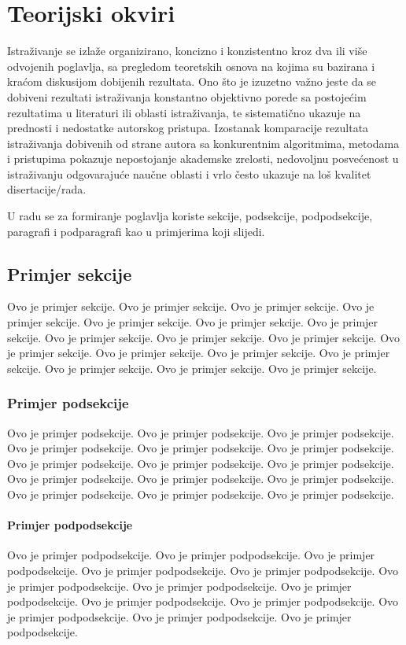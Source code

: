 \chapter{Teorijski okviri}

Istraživanje se izlaže organizirano, koncizno i konzistentno kroz dva ili više odvojenih poglavlja, sa  pregledom teoretskih osnova na kojima su bazirana i kraćom diskusijom dobijenih rezultata. Ono što je izuzetno važno jeste da se dobiveni rezultati istraživanja konstantno objektivno porede sa postojećim rezultatima u literaturi ili oblasti istraživanja, te sistematično ukazuje na prednosti i nedostatke autorskog pristupa.
Izostanak komparacije rezultata istraživanja dobivenih od strane autora sa konkurentnim algoritmima, metodama i pristupima pokazuje nepostojanje akademske zrelosti, nedovoljnu posvećenost u istraživanju odgovarajuće naučne oblasti i vrlo često ukazuje na loš kvalitet disertacije/rada.

U radu se za formiranje poglavlja koriste sekcije, podsekcije, podpodsekcije, paragrafi i podparagrafi kao u primjerima koji slijedi.
 
\section{Primjer sekcije}
Ovo je primjer sekcije. Ovo je primjer sekcije. Ovo je primjer sekcije. Ovo je primjer sekcije. Ovo je primjer sekcije. Ovo je primjer sekcije. Ovo je primjer sekcije. Ovo je primjer sekcije. Ovo je primjer sekcije. Ovo je primjer sekcije. Ovo je primjer sekcije. Ovo je primjer sekcije. Ovo je primjer sekcije. Ovo je primjer sekcije. Ovo je primjer sekcije. Ovo je primjer sekcije. Ovo je primjer sekcije.
\subsection{Primjer podsekcije}
Ovo je primjer podsekcije. Ovo je primjer podsekcije. Ovo je primjer podsekcije. Ovo je primjer podsekcije. Ovo je primjer podsekcije. Ovo je primjer podsekcije. Ovo je primjer podsekcije. Ovo je primjer podsekcije. Ovo je primjer podsekcije. Ovo je primjer podsekcije. Ovo je primjer podsekcije. Ovo je primjer podsekcije. Ovo je primjer podsekcije. Ovo je primjer podsekcije. Ovo je primjer podsekcije.
\subsubsection{Primjer podpodsekcije}
Ovo je primjer podpodsekcije. Ovo je primjer podpodsekcije. Ovo je primjer podpodsekcije. Ovo je primjer podpodsekcije. Ovo je primjer podpodsekcije. Ovo je primjer podpodsekcije. Ovo je primjer podpodsekcije. Ovo je primjer podpodsekcije. Ovo je primjer podpodsekcije. Ovo je primjer podpodsekcije. Ovo je primjer podpodsekcije. Ovo je primjer podpodsekcije. Ovo je primjer podpodsekcije.
